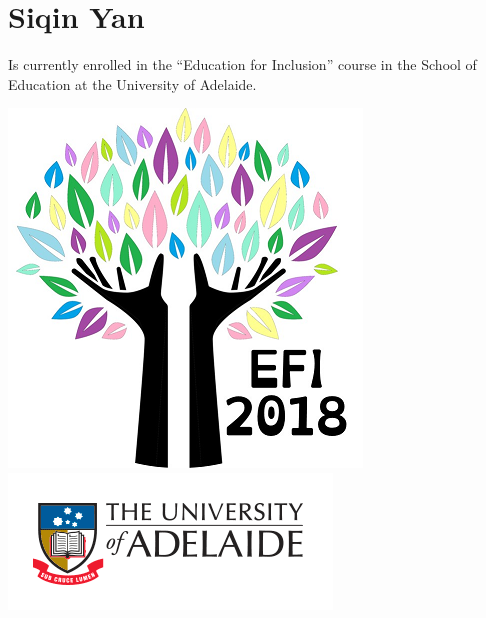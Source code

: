 \documentclass[twoside,12pt,a4paper,notitlepage]{memoir}
\begin{document}
\section*{Siqin Yan}

Is currently enrolled in the ``Education for Inclusion'' course in the School of Education at the University of Adelaide.




\vfill
\includegraphics[scale=0.5]{colour_tree.png}
\hfill
\includegraphics[scale=1]{uoa-logo-col-horiz.png}
\end{document}
